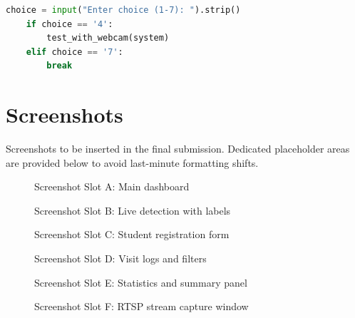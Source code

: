 \documentclass{fisatprojectfinal}
\begin{document}
\begin{appendices}
\begin{lstlisting}[language=Python,caption={Interactive test menu for registration and recognition validation}]
	choice = input("Enter choice (1-7): ").strip()
	if choice == '4':
		test_with_webcam(system)
	elif choice == '7':
		break
\end{lstlisting}

\chapter{Screenshots}
Screenshots to be inserted in the final submission. Dedicated placeholder areas are provided below to avoid last-minute formatting shifts.

\begin{figure}[h!]
	\begin{center}
		\fbox{\rule{0pt}{2.8in}\rule{0.88\linewidth}{0pt}}
		\caption{Screenshot Slot A: Main dashboard}
	\end{center}
\end{figure}

\begin{figure}[h!]
	\begin{center}
		\fbox{\rule{0pt}{2.8in}\rule{0.88\linewidth}{0pt}}
		\caption{Screenshot Slot B: Live detection with labels}
	\end{center}
\end{figure}

\begin{figure}[h!]
	\begin{center}
		\fbox{\rule{0pt}{2.8in}\rule{0.88\linewidth}{0pt}}
		\caption{Screenshot Slot C: Student registration form}
	\end{center}
\end{figure}

\begin{figure}[h!]
	\begin{center}
		\fbox{\rule{0pt}{2.8in}\rule{0.88\linewidth}{0pt}}
		\caption{Screenshot Slot D: Visit logs and filters}
	\end{center}
\end{figure}

\begin{figure}[h!]
	\begin{center}
		\fbox{\rule{0pt}{2.8in}\rule{0.88\linewidth}{0pt}}
		\caption{Screenshot Slot E: Statistics and summary panel}
	\end{center}
\end{figure}

\begin{figure}[h!]
	\begin{center}
		\fbox{\rule{0pt}{2.8in}\rule{0.88\linewidth}{0pt}}
		\caption{Screenshot Slot F: RTSP stream capture window}
	\end{center}
\end{figure}


\end{appendices}
\end{document}
